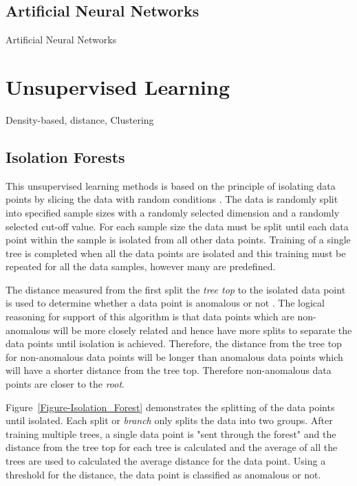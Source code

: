 \subsection{Artificial Neural Networks}
Artificial Neural Networks

\section{Unsupervised Learning}
Density-based, distance, Clustering

\subsection{Isolation Forests}
This unsupervised learning methods is based on the principle of isolating data points by slicing the data with random conditions \cite{TonyLiu2008}. The data is randomly split into specified sample sizes with a randomly selected dimension and a randomly selected cut-off value. For each sample size the data must be split until each data point within the sample is isolated from all other data points. Training of a single tree is completed when all the data points are isolated and this training must be repeated for all the data samples, however many are predefined. 

The distance measured from the first split the \emph{tree top} to the isolated data point is used to determine whether a data point is anomalous or not \cite{Hariri2021}. The logical reasoning for support of this algorithm is that data points which are non-anomalous will be more closely related and hence have more splits to separate the data points until isolation is achieved. Therefore, the distance from the tree top for non-anomalous data points will be longer than anomalous data points which will have a shorter distance from the tree top. Therefore non-anomalous data points are closer to the \emph{root}. 

Figure~\ref{Figure-Isolation_Forest} demonstrates the splitting of the data points until isolated. Each split or \emph{branch} only splits the data into two groups. After training multiple trees, a single data point is "sent through the forest" and the distance from the tree top for each tree is calculated and the average of all the trees are used to calculated the average distance for the data point. Using a threshold for the distance, the data point is classified as anomalous or not.

